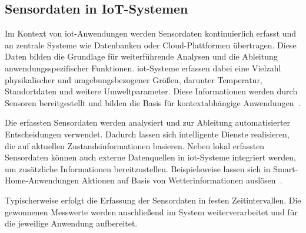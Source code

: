 \subsection{Sensordaten in IoT-Systemen}
Im Kontext von \gls{iot}-Anwendungen werden Sensordaten kontinuierlich erfasst und an zentrale Systeme wie Datenbanken oder Cloud-Plattformen übertragen. 
Diese Daten bilden die Grundlage für weiterführende Analysen und die Ableitung anwendungsspezifischer Funktionen.
\gls{iot}-Systeme erfassen dabei eine Vielzahl physikalischer und umgebungsbezogener Größen, darunter Temperatur, Standortdaten und weitere Umweltparameter. 
Diese Informationen werden durch Sensoren bereitgestellt und bilden die Basis für kontextabhängige Anwendungen~\cite{7123563}. 

Die erfassten Sensordaten werden analysiert und zur Ableitung automatisierter Entscheidungen verwendet. 
Dadurch lassen sich intelligente Dienste realisieren, die auf aktuellen Zustandsinformationen basieren. 
Neben lokal erfassten Sensordaten können auch externe Datenquellen in \gls{iot}-Systeme integriert werden, um zusätzliche Informationen bereitzustellen. 
Beispielsweise lassen sich in Smart-Home-Anwendungen Aktionen auf Basis von Wetterinformationen auslösen~\cite{7123563}. 

Typischerweise erfolgt die Erfassung der Sensordaten in festen Zeitintervallen. 
Die gewonnenen Messwerte werden anschließend im System weiterverarbeitet und für die jeweilige Anwendung aufbereitet.


